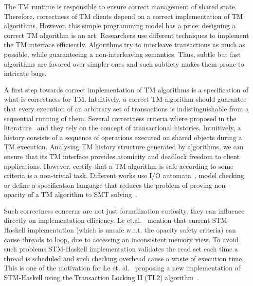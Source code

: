 \documentclass{fundam}
\begin{document}
The TM runtime is responsible to ensure correct management of shared state. Therefore,
correctness of TM clients depend on a correct implementation of TM algorithms. However,
this simple programming model has a price: designing a correct TM algorithm is an art.
Researchers use different techniques to implement the TM interface efficiently. Algorithms
try to interleave transactions as much as possible, while guaranteeing a non-interleaving
semantics. Thus, subtle but fast algorithms are favored over simpler ones and such subtlety
makes them prone to intricate bugs.


A first step towards correct implementation of TM algorithms is a specification of what
is correctness for TM. Intuitively, a correct TM algorithm should guarantee that every
execution of an arbitrary set of transactions is indistinguishable from a sequential
running of them. Several correctness criteria where proposed in the
literature~\cite{Guerraoui2008,Doherty2009,Imbs2009,LesaniP14} and
they rely on the concept of transactional histories. Intuitively,
a history consists of a sequence of operations executed on shared objects
during a TM execution. Analysing TM history structure generated by algorithms,
we can ensure that its TM interface provides atomicity and deadlock freedom to client
applications. However, certify that a TM algorithm is safe according to some criteria
is a non-trivial task. Different works use I/O automata~\cite{Lesani2012}, model
checking~\cite{CohenPZ08,cohen2007,Guerraoui2008a} or define a specification language that
reduces the problem of proving non-opacity of a TM algorithm to SMT solving~\cite{Lesani2013,DeMoura2008}.

Such correctness concerns are not just formalization curiosity, they can influence directly on implementation efficiency.
Le et.al.~\cite{Le2016} mention that current STM-Haskell implementation (which is unsafe w.r.t. the opacity safety criteria)
can cause threads to loop, due to accessing an inconsistent memory view. To avoid such problems STM-Haskell
implementation validates the read set each time a thread is scheduled and such checking overhead cause
a waste of execution time. This is one of the motivation for Le et. al.~\cite{Le2016} proposing a new
implementation of STM-Haskell using the Transaction Locking II (TL2) algorithm~\cite{Dice06}. 
\end{document}
